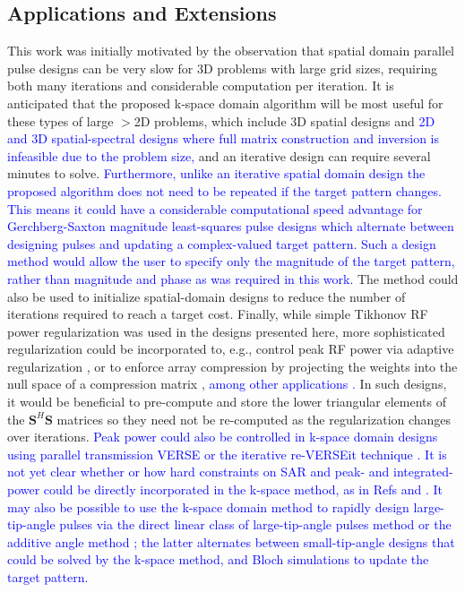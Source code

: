 \subsection*{Applications and Extensions}
This work was initially motivated by the observation that spatial domain parallel pulse designs can be very slow
for 3D problems with large grid sizes, 
requiring both many iterations and considerable computation per iteration. 
It is anticipated that the proposed k-space domain algorithm will be most useful for these types of large $>$2D problems,
which include 3D spatial designs \cite{malik2012tailored,davids2016fast} 
and \textcolor{blue}{2D and 3D spatial-spectral designs \cite{stenger2000three,setsompop2009,Malik:2010aa,yang2010four}
where full matrix construction and inversion is infeasible due to the problem size, }
and an iterative design can require several minutes to solve. 
\textcolor{blue}{Furthermore, unlike an iterative spatial domain design the proposed algorithm does not need to be repeated if the target pattern changes.
This means it could have a considerable computational speed advantage for Gerchberg-Saxton magnitude least-squares pulse designs \cite{setsompop2008magnitude,malik:mrm:2015}
which alternate between designing pulses and updating a complex-valued target pattern.
Such a design method would allow the user to specify only the magnitude of the target pattern, 
rather than magnitude and phase as was required in this work.}
The method could also be used to initialize spatial-domain designs to reduce the number of iterations required to reach a target cost. 
Finally, while simple Tikhonov RF power regularization was used in the designs presented here,
more sophisticated regularization could be incorporated to, 
e.g., control peak RF power via adaptive regularization \cite{Yip:2005:Magn-Reson-Med:16155881},
or to enforce array compression by projecting the weights into the null space of a compression matrix \cite{cao2016array},
\textcolor{blue}{among other applications \cite{padormo:2016,deniz:2019}.} 
In such designs, it would be beneficial to pre-compute and store the lower triangular elements of the $\bm{S}^H\bm{S}$ matrices
so they need not be re-computed as the regularization changes over iterations.  
\textcolor{blue}{Peak power could also be controlled in k-space domain designs using parallel transmission 
VERSE \cite{Lee:2011:MRM} or the iterative re-VERSEit technique \cite{lee2009tod}.} 
\textcolor{blue}{It is not yet clear whether or how hard constraints on SAR and 
peak- and integrated-power could be directly incorporated in the k-space method, as in Refs \cite{brunner2010optimal} and \cite{hoyos:tmi:2014}. }
\textcolor{blue}{It may also be possible to use the k-space domain method to rapidly design large-tip-angle pulses via the direct linear class of large-tip-angle pulses method \cite{Xu:2008aa} or the additive angle method \cite{grissom:mrm:2008}; 
the latter alternates between small-tip-angle designs that could be solved by the k-space method, 
and Bloch simulations to update the target pattern.} 


